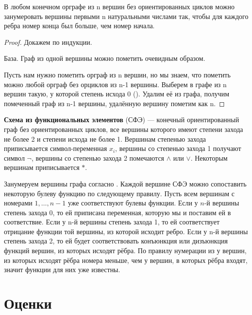 \begin{theorem}
В любом конечном орграфе из n вершин без ориентированных циклов можно занумеровать вершины
первыми n натуральными числами так, чтобы для каждого ребра номер конца был
больше, чем номер начала.
\end{theorem}
\begin{proof}
Докажем по индукции.

База. Граф из одной вершины можно пометить очевидным образом. 

Пусть нам нужно пометить орграф из n вершин, но мы знаем, что пометить можно любой
орграф без орциклов из n-1 вершины. Выберем в графе из n вершин такую, у которой
степень исхода 0 (). Удалим её из графа, получим
помеченный граф из n-1 вершины, удалённую вершину пометим как n.
\end{proof}
\begin{definition}
	\textbf{Схема из функциональных элементов} (СФЭ) --- конечный
	ориентированный граф без ориентированных циклов, все вершины которого
	имеют степени захода не более 2 и степени исхода не более 1. Вершинам
	степенью захода приписывается символ-переменная $x_i$, вершины со
	степенью захода 1 получают символ $\neg$, вершины со степенью захода 2
	помечаются $\land$ или $\lor$. Некоторым вершинам приписывается $*$.

	Занумеруем вершины графа согласно . Каждой
	вершине СФЭ можно сопоставить некоторую булеву функцию по следующему
	правилу. Пусть всем вершинам с номерами $1,\ldots, n-1$ уже
	соответствуют булевы функции. Если у $n$-й вершины степень захода 0, то
	ей приписана переменная, которую мы и поставим ей в соответствие. Если у
	n-й вершины степень захода 1, то
	ей соответствует отрицание функции той вершины, из которой исходит ребро.
	Если у n-й вершины степень захода 2, то ей будет соответствовать
	конъюнкция или дизъюнкция функций вершин, из которых исходят рёбра. По
	правилу нумерации из  у вершин, из которых
	исходят рёбра номера меньше, чем у вершин, в которых рёбра входят,
	значит функции для них уже известны.
\end{definition}

\section{Оценки}

